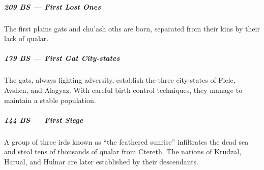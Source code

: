 \begin{linenumbers}
\subparagraph{209 BS --- First Lost Ones} The first plains gats and chu'ash oths are born, separated from their kins by their lack of qualar.

\subparagraph{179 BS --- First Gat City-states} The gats, always fighting adversity, establish the three city-states of Fiele, Avshen, and Alagyaz.
With careful birth control techniques, they manage to maintain a stable population.

\subparagraph{144 BS --- First Siege} A group of three irds known as ``the feathered sunrise'' infiltrates the dead sea and steal tens of thousands of qualar from Ctereth.
The nations of Krudzal, Harual, and Hulnar are later established by their descendants.


\end{linenumbers}
